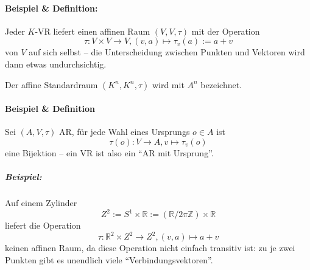 \paragraph{Beispiel \& Definition: }
	Jeder $ K $-VR liefert einen affinen Raum $ (V,V,\tau) $ mit der Operation
		\[ \tau: V\times V\to V, (v,a)\mapsto \tau_v(a):= a+v \]
	von $ V $ auf sich selbst -- die Unterscheidung zwischen Punkten und Vektoren wird dann etwas undurchsichtig.
	
	Der affine Standardraum $ (K^n,K^n,\tau) $ wird mit $ A^n $ bezeichnet.
\paragraph{Beispiel \& Definition}
	Sei $ (A,V,\tau) $ AR, für jede Wahl eines Ursprungs $ o\in A $ ist
		\[ \tau(o) :V\to A,v\mapsto \tau_v(o) \]
	eine Bijektion -- ein VR ist also ein "`AR mit Ursprung"'.
	
\subparagraph{Beispiel: }
	Auf einem Zylinder
	\[ Z^2 := S^1\times \mathbb{R}:= (\mathbb{R}/2\pi\mathbb{Z})\times \mathbb{R} \]
	liefert die Operation
		\[ \tau:\mathbb{R}^2\times Z^2\to Z^2,(v,a)\mapsto a+v \]
	keinen affinen Raum, da diese Operation nicht einfach transitiv ist: zu je zwei Punkten gibt es unendlich viele "`Verbindungsvektoren"'.

